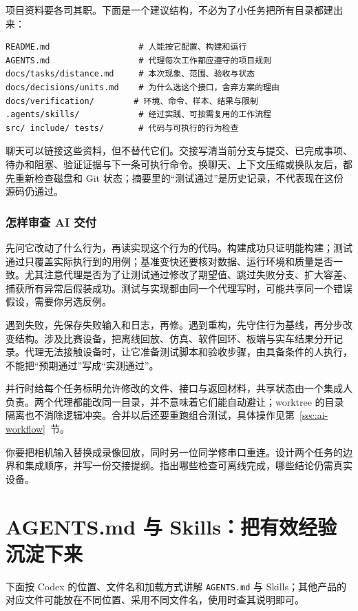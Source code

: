 项目资料要各司其职。下面是一个建议结构，不必为了小任务把所有目录都建出来：
\begin{lstlisting}[language={}]
README.md                  # 人能按它配置、构建和运行
AGENTS.md                  # 代理每次工作都应遵守的项目规则
docs/tasks/distance.md     # 本次现象、范围、验收与状态
docs/decisions/units.md    # 为什么选这个接口，舍弃方案的理由
docs/verification/        # 环境、命令、样本、结果与限制
.agents/skills/            # 经过实践、可按需复用的工作流程
src/ include/ tests/       # 代码与可执行的行为检查
\end{lstlisting}
聊天可以链接这些资料，但不替代它们。交接写清当前分支与提交、已完成事项、待办和阻塞、验证证据与下一条可执行命令。换聊天、上下文压缩或换队友后，都先重新检查磁盘和 Git 状态；摘要里的“测试通过”是历史记录，不代表现在这份源码仍通过。

\subsubsection{怎样审查 AI 交付}
先问它改动了什么行为，再读实现这个行为的代码。构建成功只证明能构建；测试通过只覆盖实际执行到的用例；基准变快还要核对数据、运行环境和质量是否一致。尤其注意代理是否为了让测试通过修改了期望值、跳过失败分支、扩大容差、捕获所有异常后假装成功。测试与实现都由同一个代理写时，可能共享同一个错误假设，需要你另选反例。

遇到失败，先保存失败输入和日志，再修。遇到重构，先守住行为基线，再分步改变结构。涉及比赛设备，把离线回放、仿真、软件回环、板端与实车结果分开记录。代理无法接触设备时，让它准备测试脚本和验收步骤，由具备条件的人执行，不能把“预期通过”写成“实测通过”。

并行时给每个任务标明允许修改的文件、接口与返回材料，共享状态由一个集成人负责。两个代理都能改同一目录，并不意味着它们能自动避让；worktree 的目录隔离也不消除逻辑冲突。合并以后还要重跑组合测试，具体操作见第~\ref{sec:ai-workflow}~节。

\begin{exercise}\label{ex:ai-management}
你要把相机输入替换成录像回放，同时另一位同学修串口重连。设计两个任务的边界和集成顺序，并写一份交接提纲。指出哪些检查可离线完成，哪些结论仍需真实设备。
\end{exercise}

\section{AGENTS.md 与 Skills：把有效经验沉淀下来}
\label{sec:ai-rules-skills}

下面按 Codex 的位置、文件名和加载方式讲解 \texttt{AGENTS.md} 与 Skills；其他产品的对应文件可能放在不同位置、采用不同文件名，使用时查其说明即可。

